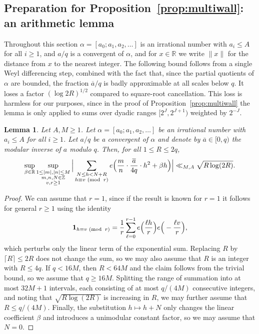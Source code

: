 \documentclass[a4paper,reqno,12pt]{amsart}
\theoremstyle{plain}
\newtheorem{lemma}[theorem]{Lemma}
\theoremstyle{plain}
\theoremstyle{remark}
\theoremstyle{plain}
\newcommand{\RR}{\mathbb{R}}
\newcommand{\mymod}[1]{{\, \, ({\rm mod} \ \, #1)}}
\theoremstyle{plain}
\theoremstyle{plain}
\begin{document}
{\subsection{Preparation for Proposition~\ref{prop:multiwall}: an
arithmetic lemma}\label{sec:arith}

Throughout this section $\alpha = [a_0; a_1, a_2, \ldots]$ is an irrational
number with $a_i \leq A$ for all $i \geq 1$, and
$a/q$ is a convergent of $\alpha$, and for $x\in\RR$ we write $\|x\|$ for
the distance from $x$ to the nearest integer.
The following bound follows from a single Weyl differencing step,
combined with the fact that, since the partial quotients of $\alpha$ are
bounded, the fraction $\overline a/q$ is badly approximable at all scales
below $q$. It loses a factor $(\log 2R)^{1/2}$ compared to square-root
cancellation. This loss is harmless for our purposes, since in the proof
of Proposition~\ref{prop:multiwall} the lemma is only applied to sums over
dyadic ranges $[2^J,2^{J+1})$ weighted by $2^{-J}$.

\begin{lemma}\label{lem:weylgauss}
Let $A , M \geq 1$.
Let $\alpha = [a_0; a_1, a_2, \ldots]$ be an irrational number with $a_i \leq A$ for all $i \geq 1$.
Let $a / q$ be a convergent of $\alpha$ and denote by $\overline{a} \in [0,q)$
the modular inverse of $a$ modulo $q$. Then, for all $1 \leq R \leq 2q$,
$$
\sup_{\beta \in \mathbb{R}} \sup_{\substack{1 \leq |m|,|n| \leq M \\ m, n, N \in \mathbb{Z} \\ v, r \geq 1}} \Big | \sum_{\substack{N \leq h < N + R \\ h \equiv v \mymod{r}}} e \Big ( \frac{m}{n} \cdot \frac{\overline{a}}{4 q} \cdot h^2 + \beta h \Big ) \Big | \ll_{M,A} \sqrt{R\log(2R)}.
$$
\end{lemma}
 \begin{proof}
We can assume that $r = 1$, since if the result is known for $r = 1$ it
follows for general $r \geq 1$ using the identity
$$
\mathbf{1}_{h \equiv v \mymod{r}} = \frac{1}{r} \sum_{\ell = 0}^{r - 1} e \Big ( \frac{\ell h}{r} \Big ) e \Big ( - \frac{\ell v}{r} \Big ){,}
$$
which perturbs only the linear term of the exponential sum. Replacing $R$
by $\lceil R\rceil\le2R$ does not change the sum, so we may also assume
that $R$ is an integer with $R\le4q$. If $q<16M$, then $R<64M$ and the
claim follows from the trivial bound, so we assume that $q\ge16M$.
Splitting the range of summation into at most $32M+1$ intervals, each
consisting of at most $q/(4M)$ consecutive integers, and noting that
$\sqrt{R\log(2R)}$ is increasing in $R$, we may further assume that
$R\le q/(4M)$. Finally, the substitution $h\mapsto h+N$ only changes the
linear coefficient $\beta$ and introduces a unimodular constant factor, so
we may assume that $N=0$.


\end{proof}}
\end{document}
